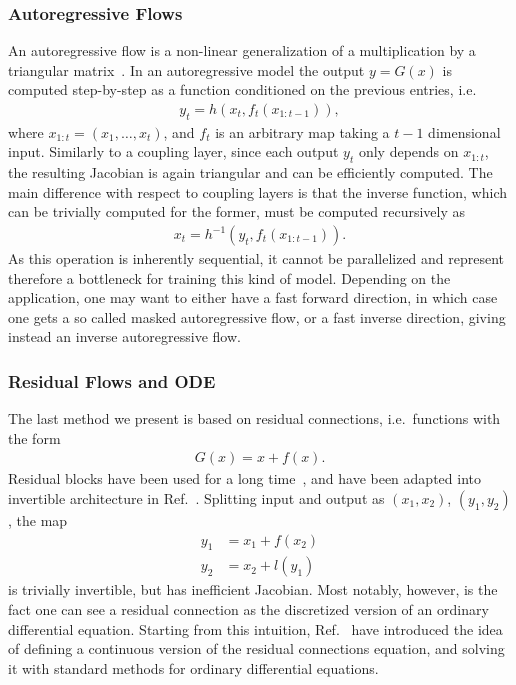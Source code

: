 \subsubsection{Autoregressive Flows}

An autoregressive flow is a non-linear generalization of a multiplication by a triangular matrix~\cite{kingma2017improving, papamakarios2018masked}. In an autoregressive model the output $y = G(x)$ is computed step-by-step as a function conditioned on the previous entries, i.e.\
%
\begin{align}
y_t = h(x_t, f_t(x_{1:t-1})),
\end{align}
%
where $x_{1:t} = (x_1, \ldots, x_t)$, and $f_t$ is an arbitrary map taking a $t-1$ dimensional input. Similarly to a coupling layer, since each output $y_t$ only depends on $x_{1:t}$, the resulting Jacobian is again triangular and can be efficiently computed. The main difference with respect to coupling layers is that the inverse function, which can be trivially computed for the former, must be computed recursively as
%
\begin{align}
x_t = h^{-1}(y_t, f_t(x_{1:t-1})).
\end{align}
%
As this operation is inherently sequential, it cannot be parallelized and represent therefore a bottleneck for training this kind of model. Depending on the application, one may want to either have a fast forward direction, in which case one gets a so called masked autoregressive flow, or a fast inverse direction, giving instead an inverse autoregressive flow.

\subsubsection{Residual Flows and ODE}

The last method we present is based on residual connections, i.e.\ functions with the form
%
\begin{align}
G(x) = x + f(x).
\end{align}
%
Residual blocks have been used for a long time~\cite{he2015deep}, and have been adapted into invertible architecture in Ref.~\cite{gomez2017reversible, jacobsen2018irevnet}. Splitting input and output as $(x_1, x_2)$, $(y_1, y_2)$, the map
%
\begin{align}
y_1 &= x_1 + f(x_2)\\
y_2 &= x_2 + l(y_1)
\end{align}
%
is trivially invertible, but has inefficient Jacobian. Most notably, however, is the fact one can see a residual connection as the discretized version of an ordinary differential equation. Starting from this intuition, Ref.~\cite{dupont2019augmented, chen2019neural , grathwohl2018ffjord} have introduced the idea of defining a continuous version of the residual connections equation, and solving it with standard methods for ordinary differential equations.


